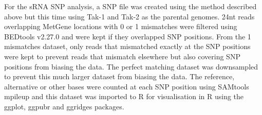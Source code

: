 For the sRNA SNP analysis, a SNP file was created using the method described above but this time using Tak-1 and Tak-2 as the parental genomes. 24nt reads overlapping MetGene locations with 0 or 1 mismatches were filtered using BEDtools v2.27.0 and were kept if they overlapped SNP positions. From the 1 mismatches dataset, only reads that mismatched exactly at the SNP positions were kept to prevent reads that mismatch elsewhere but also covering SNP positions from biasing the data. The perfect matching dataset was downsampled to prevent this much larger dataset from biasing the data. The reference, alternative or other bases were counted at each SNP position using SAMtools mpileup and this dataset was imported to R for visualisation in R using the ggplot, ggpubr and ggridges packages.


